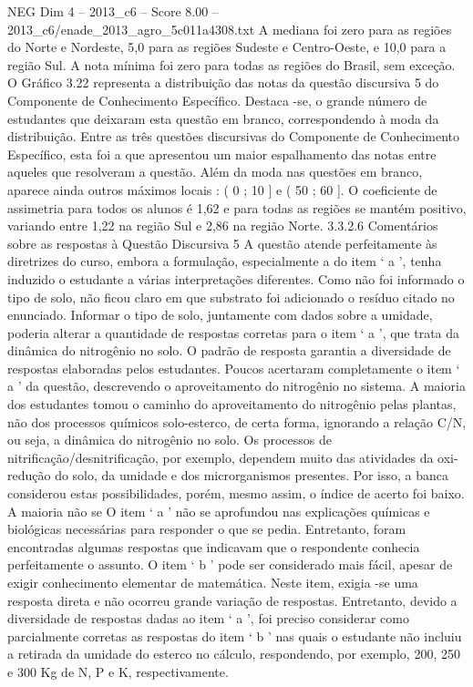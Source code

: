 \begin{textsample}{NEG Dim 4 – 2013\_c6 – Score 8.00 – 2013\_c6/enade\_2013\_agro\_5c011a4308.txt}
A mediana foi zero para as regiões do Norte e Nordeste, 5,0 para as regiões Sudeste e Centro-Oeste, e 10,0 para a região Sul.
A nota mínima foi zero para todas as regiões do Brasil, sem exceção.
O Gráfico 3.22 representa a distribuição das notas da questão discursiva 5 do Componente de Conhecimento Específico.
Destaca -se, o grande número de estudantes que deixaram esta questão em branco, correspondendo à moda da distribuição.
Entre as três questões discursivas do Componente de Conhecimento Específico, esta foi a que apresentou um maior espalhamento das notas entre aqueles que resolveram a questão.
Além da moda nas questões em branco, aparece ainda outros máximos locais : ( 0 ; 10 ] e ( 50 ; 60 ].
O coeficiente de assimetria para todos os alunos é 1,62 e para todas as regiões se mantém positivo, variando entre 1,22 na região Sul e 2,86 na região Norte. 3.3.2.6 Comentários sobre as respostas à Questão Discursiva 5 A questão atende perfeitamente às diretrizes do curso, embora a formulação, especialmente a do item ‘ a ’, tenha induzido o estudante a várias interpretações diferentes.
Como não foi informado o tipo de solo, não ficou claro em que substrato foi adicionado o resíduo citado no enunciado.
Informar o tipo de solo, juntamente com dados sobre a umidade, poderia alterar a quantidade de respostas corretas para o item ‘ a ’, que trata da dinâmica do nitrogênio no solo.
O padrão de resposta garantia a diversidade de respostas elaboradas pelos estudantes.
Poucos acertaram completamente o item ‘ a ’ da questão, descrevendo o aproveitamento do nitrogênio no sistema.
A maioria dos estudantes tomou o caminho do aproveitamento do nitrogênio pelas plantas, não dos processos químicos solo-esterco, de certa forma, ignorando a relação C/N, ou seja, a dinâmica do nitrogênio no solo.
Os processos de nitrificação/desnitrificação, por exemplo, dependem muito das atividades da oxi-redução do solo, da umidade e dos microrganismos presentes.
Por isso, a banca considerou estas possibilidades, porém, mesmo assim, o índice de acerto foi baixo.
A maioria não se O item ‘ a ’ não se aprofundou nas explicações químicas e biológicas necessárias para responder o que se pedia.
Entretanto, foram encontradas algumas respostas que indicavam que o respondente conhecia perfeitamente o assunto.
O item ‘ b ’ pode ser considerado mais fácil, apesar de exigir conhecimento elementar de matemática.
Neste item, exigia -se uma resposta direta e não ocorreu grande variação de respostas.
Entretanto, devido a diversidade de respostas dadas ao item ‘ a ’, foi preciso considerar como parcialmente corretas as respostas do item ‘ b ’ nas quais o estudante não incluiu a retirada da umidade do esterco no cálculo, respondendo, por exemplo, 200, 250 e 300 Kg de N, P e K, respectivamente.

\end{textsample}
